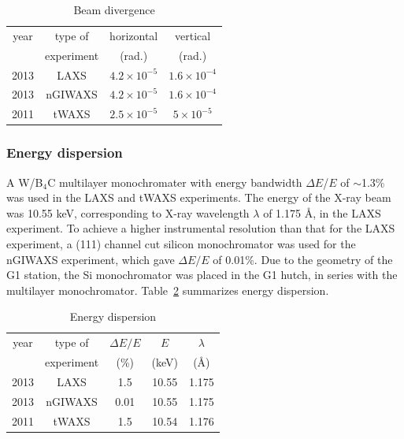 \begin{table}[htbp]
  \centering
  \begin{tabular}{cccc}
    \hline
    year & type of  & horizontal & vertical \\
     & experiment & (rad.) & (rad.) \\
    \hline
    2013 & LAXS & $4.2 \times 10^{-5}$ & $1.6 \times 10^{-4}$ \\
    2013 & nGIWAXS & $4.2 \times 10^{-5}$ & $1.6 \times 10^{-4}$ \\
    2011 & tWAXS & $2.5 \times 10^{-5}$ & $5 \times 10^{-5}$ \\
    \hline
  \end{tabular}
  \caption[Beam divergence]{Beam divergence}
  \label{tab:beam_divergence}
\end{table}

\subsubsection{Energy dispersion}\label{sec:energy_dispersion}
A W/B$_4$C multilayer monochromater with energy bandwidth $\Delta E$/$E$ of
$\sim$1.3\% was used in the LAXS and tWAXS experiments. 
The energy of the X-ray beam was 10.55 keV, corresponding to X-ray wavelength 
$\lambda$ of 1.175 \AA, in the LAXS experiment.
To achieve a higher instrumental resolution than that for 
the LAXS experiment, a (111) channel cut silicon monochromator was used for 
the nGIWAXS experiment, which gave $\Delta E/E$ of 0.01\%.
Due to the geometry of the G1 station, the Si monochromator was placed in
the G1 hutch, in series with the multilayer monochromator. 
Table~\ref{tab:energy_dispersion} summarizes energy dispersion.

\begin{table}[htbp]
  \centering
  \begin{tabular}{ccccc}
    \hline
    year & type of & $\Delta E/E$ & $E$ & $\lambda$ \\
     & experiment & (\%) & (keV) & (\AA) \\
    \hline
    2013 & LAXS & 1.5 & 10.55 & 1.175 \\
    2013 & nGIWAXS & 0.01 & 10.55 & 1.175 \\
    2011 & tWAXS & 1.5 & 10.54 & 1.176 \\
    \hline
  \end{tabular}
  \caption[Energy dispersion]{Energy dispersion}
  \label{tab:energy_dispersion}
\end{table}

